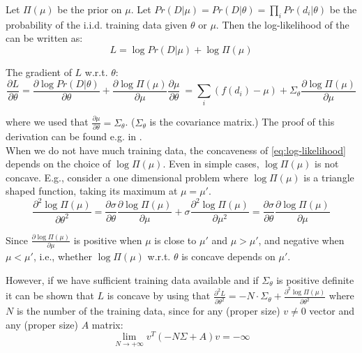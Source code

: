 \documentclass[12pt]{article}
\begin{document}
 
Let $\Pi(\mu)$ be the prior on $\mu$. 
Let $Pr(D|\mu)=Pr(D|\theta)=\prod_{i}Pr(d_{i}|\theta)$ be the probability 
of the i.i.d. training data given $\theta$ or $\mu$. Then the log-likelihood 
of the can be written as:
\begin{equation}\label{eq:log-likelihood}
  L=\log Pr(D|\mu) + \log \Pi(\mu)
\end{equation}
 
The gradient of $L$ w.r.t. $\theta$:   
\begin{equation}\label{eq:gradient}
  \frac{\partial L}{\partial \theta}
        =\frac{\partial \log Pr(D|\theta)}{\partial \theta} + 
         \frac{\partial \log \Pi(\mu)}{\partial \mu}
         \frac{\partial \mu}{\partial \theta}\
        =\sum_{i}\left( f(d_{i})-\mu \right) + 
         \Sigma_{\theta} \frac{\partial \log \Pi(\mu)}{\partial \mu}
\end{equation}

where we used that $\frac{\partial \mu}{\partial \theta}=\Sigma_{\theta}$. 
($\Sigma_{\theta}$ is the covariance matrix.) The proof of this 
derivation can be found e.g. in \cite{Koller+Friedman:09}.\\

When we do not have much training data, the concaveness of 
\eqref{eq:log-likelihood} depends on the choice of $\log \Pi(\mu)$. 
Even in simple cases, $\log \Pi(\mu)$ is not concave. E.g., consider
a one dimensional problem where $\log \Pi(\mu)$ is a triangle shaped function,
 taking its maximum at $\mu=\mu'$.
\begin{equation}\label{eq:concave-example} 
  \frac{\partial^{2} \log \Pi(\mu)}{\partial \theta^{2}} = 
  \frac{\partial \sigma}{\partial \theta} 
  \frac{\partial \log \Pi(\mu)}{\partial \mu}
  + \sigma
  \frac{\partial^{2} \log \Pi(\mu)}{\partial \mu^{2}}
  =   \frac{\partial \sigma}{\partial \theta} 
  \frac{\partial \log \Pi(\mu)}{\partial \mu}
\end{equation}

Since 
$\frac{\partial \log \Pi(\mu)}{\partial \mu}$ is positive when $\mu$ is close
to $\mu'$ and $\mu>\mu'$, and negative when $\mu<\mu'$, i.e., whether
$\log \Pi(\mu)$ w.r.t. $\theta$ is concave depends on $\mu'$.

However, if we have sufficient training data available and if $\Sigma_{\theta}$
is positive definite it can be shown that $L$ is concave by using that
$\frac{\partial^{2} L}{\partial \theta^{2}}=-N \cdot \Sigma_{\theta} + 
\frac{\partial^{2} \log \Pi(\mu)}{\partial \theta^{2}}$ where $N$ is the number
of the training data, since for any (proper size) $v \neq 0$ vector and any 
(proper size) $A$ matrix: 
\[
  \lim_{N \to +\infty} v^{T} \left(-N \Sigma + A \right) v  = -\infty
\]
\end{document}
